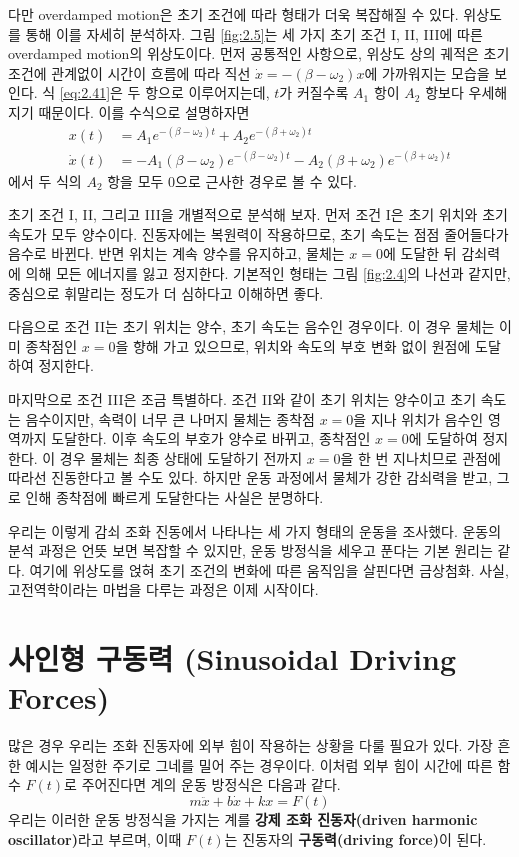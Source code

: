 \documentclass[chapter, oneside, b5paper]{oblivoir}
\theoremstyle{plain}
\theoremstyle{definition}
\theoremstyle{remark}
\begin{document}
다만 overdamped motion은 초기 조건에 따라 형태가 더욱 복잡해질 수 있다. 위상도를 통해 이를 자세히 분석하자. 그림 \ref{fig:2.5}는 세 가지 초기 조건 I, II, III에 따른 overdamped motion의 위상도이다. 먼저 공통적인 사항으로, 위상도 상의 궤적은 초기 조건에 관계없이 시간이 흐름에 따라 직선 $\dot{x}=-(\beta-\omega_2)x$에 가까워지는 모습을 보인다. 식 \ref{eq:2.41}은 두 항으로 이루어지는데, $t$가 커질수록 $A_1$ 항이 $A_2$ 항보다 우세해지기 때문이다. 이를 수식으로 설명하자면
\begin{equation}
\begin{split}
    x(t) &= A_1 e^{-(\beta-\omega_2)t} + A_2e^{-(\beta+\omega_2)t} \\ \dot{x}(t) &= -A_1 (\beta - \omega_2) e^{-(\beta-\omega_2)t} - A_2 (\beta+\omega_2)e^{-(\beta+\omega_2)t} \label{eq:2.42}
\end{split}
\end{equation}
에서 두 식의 $A_2$ 항을 모두 0으로 근사한 경우로 볼 수 있다.

초기 조건 I, II, 그리고 III을 개별적으로 분석해 보자. 먼저 조건 I은 초기 위치와 초기 속도가 모두 양수이다. 진동자에는 복원력이 작용하므로, 초기 속도는 점점 줄어들다가 음수로 바뀐다. 반면 위치는 계속 양수를 유지하고, 물체는 $x=0$에 도달한 뒤 감쇠력에 의해 모든 에너지를 잃고 정지한다. 기본적인 형태는 그림 \ref{fig:2.4}의 나선과 같지만, 중심으로 휘말리는 정도가 더 심하다고 이해하면 좋다.

다음으로 조건 II는 초기 위치는 양수, 초기 속도는 음수인 경우이다. 이 경우 물체는 이미 종착점인 $x=0$을 향해 가고 있으므로, 위치와 속도의 부호 변화 없이 원점에 도달하여 정지한다.

마지막으로 조건 III은 조금 특별하다. 조건 II와 같이 초기 위치는 양수이고 초기 속도는 음수이지만, 속력이 너무 큰 나머지 물체는 종착점 $x=0$을 지나 위치가 음수인 영역까지 도달한다. 이후 속도의 부호가 양수로 바뀌고, 종착점인 $x=0$에 도달하여 정지한다. 이 경우 물체는 최종 상태에 도달하기 전까지 $x=0$을 한 번 지나치므로 관점에 따라선 진동한다고 볼 수도 있다. 하지만 운동 과정에서 물체가 강한 감쇠력을 받고, 그로 인해 종착점에 빠르게 도달한다는 사실은 분명하다.

우리는 이렇게 감쇠 조화 진동에서 나타나는 세 가지 형태의 운동을 조사했다. 운동의 분석 과정은 언뜻 보면 복잡할 수 있지만, 운동 방정식을 세우고 푼다는 기본 원리는 같다. 여기에 위상도를 얹혀 초기 조건의 변화에 따른 움직임을 살핀다면 금상첨화. 사실, 고전역학이라는 마법을 다루는 과정은 이제 시작이다.

\section{사인형 구동력 (Sinusoidal Driving Forces)}
많은 경우 우리는 조화 진동자에 외부 힘이 작용하는 상황을 다룰 필요가 있다. 가장 흔한 예시는 일정한 주기로 그네를 밀어 주는 경우이다. 이처럼 외부 힘이 시간에 따른 함수 $F(t)$로 주어진다면 계의 운동 방정식은 다음과 같다.
\begin{equation}
    m\ddot{x}+b\dot{x}+kx=F(t) \label{eq:2.43}
\end{equation}
우리는 이러한 운동 방정식을 가지는 계를 \textbf{강제 조화 진동자(driven harmonic oscillator)}라고 부르며, 이때 $F(t)$는 진동자의 \textbf{구동력(driving force)}이 된다.
\end{document}
